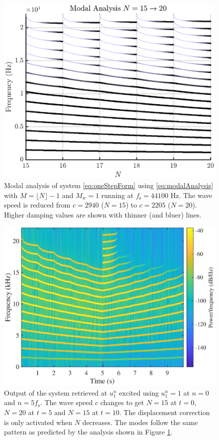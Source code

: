 \begin{figure}[t]
    \centering
\includegraphics[width=\figwidth\columnwidth]{Figures/modalAnalysisDamping.eps}
\caption{\label{fig:modalAnalysis}{Modal analysis of system \eqref{eq:oneStepForm} using \eqref{eq:modalAnalysis} with $M = \lfloor N\rfloor - 1$ and $M_w = 1$ running at $f_\text{s} = 44100$ Hz. The wave speed is reduced from $c = 2940$ ($N = 15$) to $c = 2205$ ($N = 20$). Higher damping values are shown with thinner (and bluer) lines.}}
\end{figure} 
\begin{figure}[t]
    \centering
\includegraphics[width=\figwidth\columnwidth]{Figures/spec15-20-15.eps}
\caption{\label{fig:spectrogram}{Output of the system retrieved at $u_1^n$ excited using $u_1^n = 1$ at $n = 0$ and $n = 5f_\text{s}$. The wave speed $c$ changes to get $N = 15$ at $t=0$, $N = 20$ at $t=5$ and $N = 15$ at $t=10$. The displacement correction is only activated when $N$ decreases. The modes follow the same pattern as predicted by the analysis shown in Figure \ref{fig:modalAnalysis}.}}
\end{figure} 

